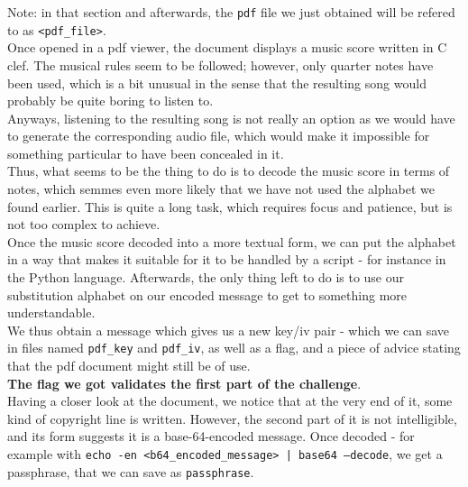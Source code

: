 \documentclass[12pt,a4paper]{article}
\begin{document}
    Note: in that section and afterwards, the \texttt{pdf} file we just obtained will be refered to as \texttt{<pdf\_file>}.\\

    Once opened in a pdf viewer, the document displays a music score written in
    C clef. The musical rules seem to be followed; however, only quarter notes
    have been used, which is a bit unusual in the sense that the resulting song
    would probably be quite boring to listen to.\\

    Anyways, listening to the resulting song is not really an option as we
    would have to generate the corresponding audio file, which would make it
    impossible for something particular to have been concealed in it.\\

    Thus, what seems to be the thing to do is to decode the music score in
    terms of notes, which semmes even more likely that we have not used the
    alphabet we found earlier. This is quite a long task, which requires focus
    and patience, but is not too complex to achieve.\\

    Once the music score decoded into a more textual form, we can put the
    alphabet in a way that makes it suitable for it to be handled by a script -
    for instance in the Python language. Afterwards, the only thing left to do
    is to use our substitution alphabet on our encoded message to get to
    something more understandable.\\

    We thus obtain a message which gives us a new key/iv pair - which we can
    save in files named \texttt{pdf\_key} and \texttt{pdf\_iv}, as well as a
    flag, and a piece of advice stating that the pdf document might still be of
    use.\\

    \textbf{The flag we got validates the first part of the challenge}.\\

    Having a closer look at the document, we notice that at the very end of it,
    some kind of copyright line is written. However, the second part of it is
    not intelligible, and its form suggests it is a base-64-encoded message.
    Once decoded - for example with \texttt{echo -en <b64\_encoded\_message> |
    base64 --decode}, we get a passphrase, that we can save as
    \texttt{passphrase}.\\
\end{document}
